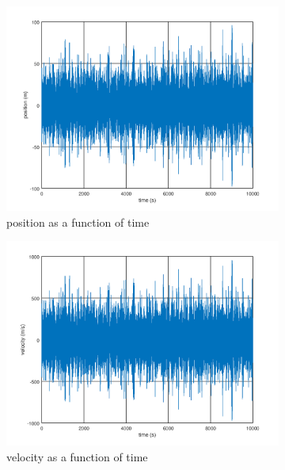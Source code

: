 \documentclass[12pt, twoside]{article}
\begin{document}
\begin{figure}[h!]
	\label{fig:simulation}
	\centering
	\begin{subfigure}[h!]{0.45\linewidth}
		\includegraphics[width=\linewidth]{graphs/simulation/position.png}
		\caption{position as a function of time}
	\end{subfigure}
	\begin{subfigure}[h!]{0.45\linewidth}
		\includegraphics[width=\linewidth]{graphs/simulation/velocity.png}
		\caption{velocity as a function of time}
	\end{subfigure}
	\begin{subfigure}[h!]{0.45\linewidth}

\end{subfigure}
\end{figure}
\end{document}
